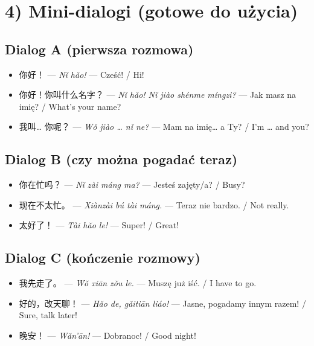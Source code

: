 \documentclass[11pt]{article}
\begin{document}
	\section*{4) Mini-dialogi (gotowe do użycia)}
	
	\subsection*{Dialog A (pierwsza rozmowa)}
	\begin{itemize}[leftmargin=*, itemsep=3pt]
		\item 你好！ — \textit{Nǐ hǎo!} — Cześć! / Hi!
		\item 你好！你叫什么名字？ — \textit{Nǐ hǎo! Nǐ jiào shénme míngzi?} — Jak masz na imię? / What’s your name?
		\item 我叫… 你呢？ — \textit{Wǒ jiào … nǐ ne?} — Mam na imię… a Ty? / I’m … and you?
	\end{itemize}
	
	\subsection*{Dialog B (czy można pogadać teraz)}
	\begin{itemize}[leftmargin=*, itemsep=3pt]
		\item 你在忙吗？ — \textit{Nǐ zài máng ma?} — Jesteś zajęty/a? / Busy?
		\item 现在不太忙。 — \textit{Xiànzài bú tài máng.} — Teraz nie bardzo. / Not really.
		\item 太好了！ — \textit{Tài hǎo le!} — Super! / Great!
	\end{itemize}
	
	\subsection*{Dialog C (kończenie rozmowy)}
	\begin{itemize}[leftmargin=*, itemsep=3pt]
		\item 我先走了。 — \textit{Wǒ xiān zǒu le.} — Muszę już iść. / I have to go.
		\item 好的，改天聊！ — \textit{Hǎo de, gǎitiān liáo!} — Jasne, pogadamy innym razem! / Sure, talk later!
		\item 晚安！ — \textit{Wǎn’ān!} — Dobranoc! / Good night!
	\end{itemize}
	
\end{document}
